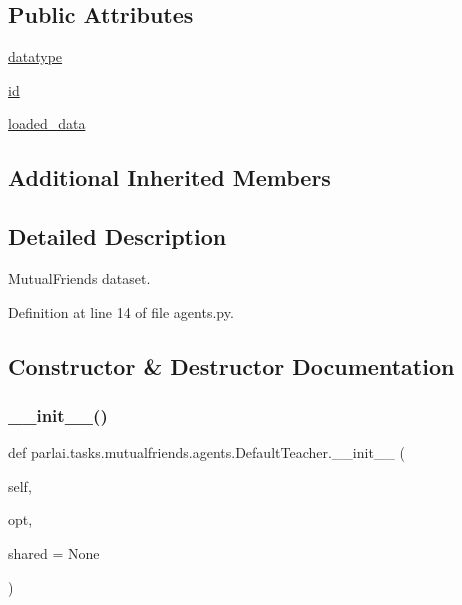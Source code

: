 \subsection*{Public Attributes}
\begin{DoxyCompactItemize}
\item 
\hyperlink{classparlai_1_1tasks_1_1mutualfriends_1_1agents_1_1DefaultTeacher_a72fe5fce4948609f6744730626aef8b1}{datatype}
\item 
\hyperlink{classparlai_1_1tasks_1_1mutualfriends_1_1agents_1_1DefaultTeacher_a61d23236d8ab996b4bc7c72d4f966ba9}{id}
\item 
\hyperlink{classparlai_1_1tasks_1_1mutualfriends_1_1agents_1_1DefaultTeacher_a36b8bfe95e840334f7db7fe93f54c646}{loaded\+\_\+data}
\end{DoxyCompactItemize}
\subsection*{Additional Inherited Members}


\subsection{Detailed Description}
\begin{DoxyVerb}MutualFriends dataset.
\end{DoxyVerb}
 

Definition at line 14 of file agents.\+py.



\subsection{Constructor \& Destructor Documentation}
\mbox{\label{classparlai_1_1tasks_1_1mutualfriends_1_1agents_1_1DefaultTeacher_a61e000a690cb89a9c8fe20692d1f8106}} 
\subsubsection{\texorpdfstring{\+\_\+\+\_\+init\+\_\+\+\_\+()}{\_\_init\_\_()}}
{\footnotesize\ttfamily def parlai.\+tasks.\+mutualfriends.\+agents.\+Default\+Teacher.\+\_\+\+\_\+init\+\_\+\+\_\+ (\begin{DoxyParamCaption}\item[{}]{self,  }\item[{}]{opt,  }\item[{}]{shared = {\ttfamily None} }\end{DoxyParamCaption})}



